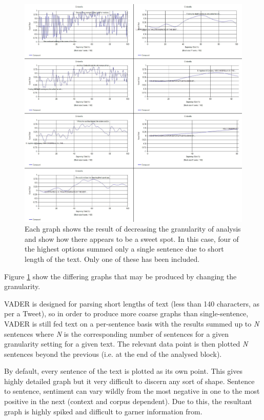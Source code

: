 \documentclass{article}
\begin{document}
        \begin{figure}
            \includegraphics[width=1\textwidth]{Figures/Blocksize/Cinderella/cinderellaGran}
            \centering
            \caption{Each graph shows the result of decreasing the granularity of analysis and show how there appears to be a sweet spot. In this case, four of the highest options summed only a single sentence due to short length of the text. Only one of these has been included.}
            \label{fig:cinderellaGran}
        \end{figure}
        Figure \ref{fig:cinderellaGran} show the differing graphs that may be produced by changing the granularity.

        VADER is designed for parsing short lengths of text (less than 140 characters, as per a Tweet), so in order to produce more coarse graphs than single-sentence, VADER is still fed text on a per-sentence basis with the results summed up to \textit{N} sentences where \textit{N} is the corresponding number of sentences for a given granularity setting for a given text. The relevant data point is then plotted \textit{N} sentences beyond the previous (i.e. at the end of the analysed block).

        By default, every sentence of the text is plotted as its own point. This gives highly detailed graph but it very difficult to discern any sort of shape. Sentence to sentence, sentiment can vary wildly from the most negative in one to the most positive in the next (context and corpus dependent). Due to this, the resultant graph is highly spiked and difficult to garner information from.
\end{document}
